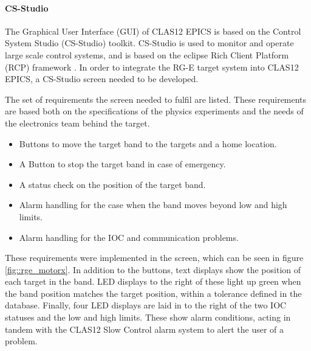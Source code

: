     \paragraph{CS-Studio}
        The Graphical User Interface (GUI) of CLAS12 EPICS is based on the Control System Studio (CS-Studio) toolkit.
        CS-Studio is used to monitor and operate large scale control systems, and is based on the eclipse Rich Client Platform (RCP) framework \cite{kasemir2007}.
        In order to integrate the RG-E target system into CLAS12 EPICS, a CS-Studio screen needed to be developed.

        The set of requirements the screen needed to fulfil are listed.
        These requirements are based both on the specifications of the physics experiments and the needs of the electronics team behind the target.
        \begin{itemize}
            \item
                Buttons to move the target band to the targets and a home location.
            \item
                A Button to stop the target band in case of emergency.
            \item
                A status check on the position of the target band.
            \item
                Alarm handling for the case when the band moves beyond low and high limits.
            \item
                Alarm handling for the IOC and communication problems.
        \end{itemize}
        These requirements were implemented in the screen, which can be seen in figure \ref{fig::rge_motorx}.
        In addition to the buttons, text displays show the position of each target in the band.
        LED displays to the right of these light up green when the band position matches the target position, within a tolerance defined in the database.
        Finally, four LED displays are laid in to the right of the two IOC statuses and the low and high limits.
        These show alarm conditions, acting in tandem with the CLAS12 Slow Control alarm system to alert the user of a problem.

